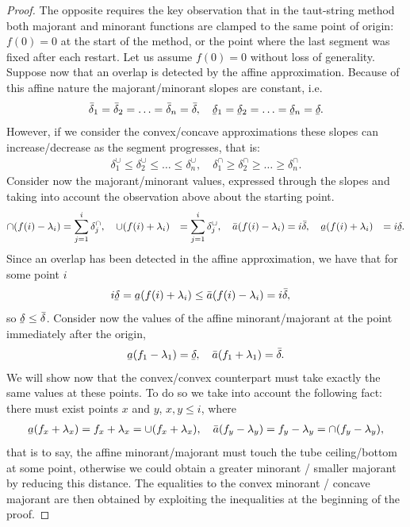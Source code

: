 \documentclass[twoside,11pt]{article}
\newcommand{\ubar}[1]{\underaccent{\bar}{#1}}
\numberwithin{equation}{section}
\numberwithin{theorem}{section}
\begin{document}
\begin{proof}
 The opposite requires the key observation that in the taut-string method both majorant and minorant functions are clamped to the same point of origin: $f(0) = 0$ at the start of the method, or the point where the last segment was fixed after each restart. Let us assume $f(0) = 0$ without loss of generality. Suppose now that an overlap is detected by the affine approximation.
 Because of this affine nature the majorant/minorant slopes are constant, i.e.
 \begin{align*}
  \bar \delta_1 = \bar \delta_2 = \ldots = \bar \delta_n = \bar \delta, \quad
  \ubar \delta_1 = \ubar \delta_2 = \ldots = \ubar \delta_n = \ubar \delta.
 \end{align*}
 However, if we consider the convex/concave approximations these slopes can increase/decrease as the segment progresses, that is:
 \begin{align*}
  \delta^{\cup}_1 \leq \delta^{\cup}_2 \leq \ldots \leq \delta^{\cup}_n, \quad
  \delta^{\cap}_1 \geq \delta^{\cap}_2 \geq \ldots \geq \delta^{\cap}_n.
 \end{align*}
 Consider now the majorant/minorant values, expressed through the slopes and taking into account the observation above about the starting point.
 \begin{align*}
  \cap(f(i) - \lambda_i) &= \sum_{j=1}^{i} \delta^{\cap}_j, \quad
  \cup(f(i) + \lambda_i) &= \sum_{j=1}^{i} \delta^{\cup}_j, \quad
  \bar a(f(i) - \lambda_i) &= i \bar \delta, \quad
  \ubar a(f(i) + \lambda_i) &= i \ubar \delta.
 \end{align*}
 Since an overlap has been detected in the affine approximation, we have that for some point $i$
 \begin{align*}
  i \ubar \delta = \ubar a(f(i) + \lambda_i) &\leq \bar a(f(i) - \lambda_i) = i \bar \delta,
 \end{align*}
 so $\ubar \delta \leq \bar \delta$.
 Consider now the values of the affine minorant/majorant at the point immediately after the origin,
 \begin{align*}
  \ubar a(f_1 - \lambda_1) = \ubar \delta, \quad
  \bar a(f_1 + \lambda_1) = \bar \delta.
 \end{align*}
 We will show now that the convex/convex counterpart must take exactly the same values at these points. To do so we take into account the following fact: there must exist points $x$ and $y$, $x, y \leq i$, where
 \begin{align*}
  \ubar a(f_x + \lambda_x) = f_x + \lambda_x = \cup(f_x + \lambda_x), \quad
  \bar a(f_y - \lambda_y) = f_y - \lambda_y = \cap(f_y - \lambda_y),
 \end{align*}
 that is to say, the affine minorant/majorant must touch the tube ceiling/bottom at some point, otherwise we could obtain a greater minorant / smaller majorant by reducing this distance. The equalities to the convex minorant / concave majorant are then obtained by exploiting the inequalities at the beginning of the proof.


\end{proof}
\end{document}
